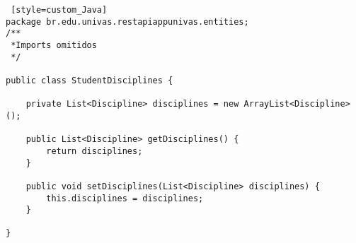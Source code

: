 \begin{lstlisting} [style=custom_Java]
package br.edu.univas.restapiappunivas.entities;
/**
 *Imports omitidos
 */

public class StudentDisciplines {

	private List<Discipline> disciplines = new ArrayList<Discipline>();

	public List<Discipline> getDisciplines() {
		return disciplines;
	}

	public void setDisciplines(List<Discipline> disciplines) {
		this.disciplines = disciplines;
	}

}

\end{lstlisting}

